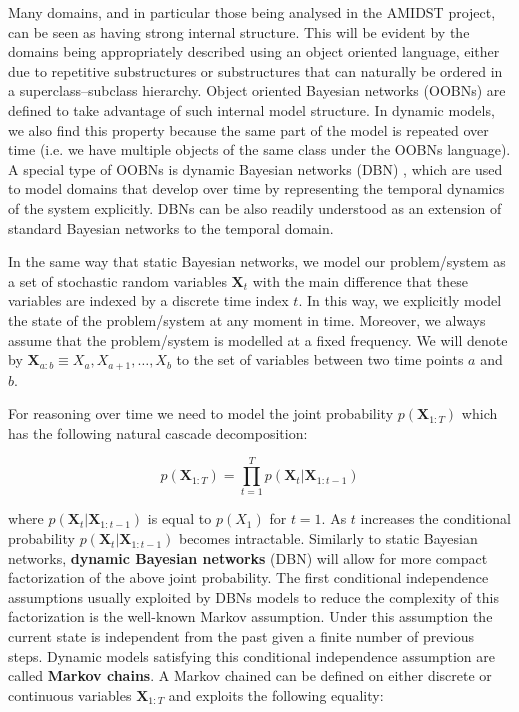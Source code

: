 Many domains, and in particular those being analysed in the AMIDST project, can be seen as having strong internal structure. This will be evident by the domains being appropriately described using an object oriented language, either due to repetitive substructures or substructures that can naturally be ordered in a superclass–subclass hierarchy.  Object oriented Bayesian networks \cite{KollerPfeffer1997} (OOBNs) are defined to take advantage of such internal model structure. In dynamic models, we also find this property because the same part of the model is repeated over time (i.e. we have multiple objects of the same class under the OOBNs language). A special type of OOBNs is dynamic Bayesian networks (DBN) \cite{DeanKanazawa1989}, which are used to model domains that develop over time by representing the temporal dynamics of the system explicitly. DBNs can be also readily understood as an extension of standard Bayesian networks to the temporal domain. 

In the same way that static Bayesian networks, we model our problem/system as a set of stochastic random variables $\bm X_t$ with the main difference that these variables are indexed by a discrete time index $t$. In this way,  we explicitly model the state of the problem/system at any moment in time. Moreover,  we always assume that the problem/system is modelled at a fixed frequency. We will denote by $\bm X_{a:b} \equiv X_a,X_{a+1},\ldots,X_{b}$ to the set of variables between two time points $a$ and $b$.  

For reasoning over time we need to model the joint probability $p(\bm X_{1:T})$ which has the following natural cascade decomposition:

$$p(\bm X_{1:T})  = \prod_{t=1}^T p(\bm X_t|\bm X_{1:t-1})$$

\noindent where $p(\bm X_t|\bm X_{1:t-1})$ is equal to $p(X_1)$ for $t=1$. As $t$ increases the conditional probability $p(\bm X_t|\bm X_{1:t-1})$ becomes intractable. Similarly to static Bayesian networks, \textbf{dynamic Bayesian networks} (DBN) will allow for more compact factorization of the above joint probability. The first conditional independence assumptions usually  exploited by DBNs models to reduce the complexity of this factorization is the well-known Markov assumption. Under this assumption the current state is independent from the past given a finite number of previous steps.  Dynamic models satisfying this conditional independence assumption are called \textbf{Markov chains}. A Markov chained can be defined on either discrete or continuous variables $\bm X_{1:T}$ and exploits the following equality:

